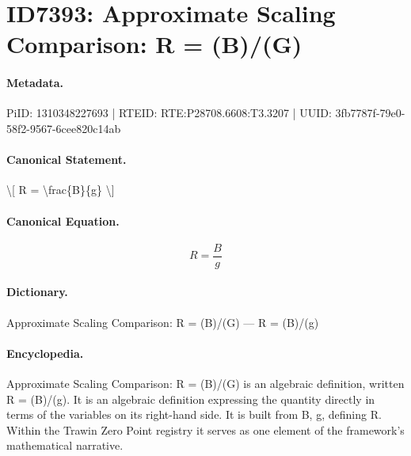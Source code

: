 \section*{ID7393: Approximate Scaling Comparison: R = (B)/(G)}
\paragraph{Metadata.}
PiID: 1310348227693 | RTEID: RTE:P28708.6608:T3.3207 | UUID: 3fb7787f-79e0-58f2-9567-6cee820c14ab

\paragraph{Canonical Statement.}
\textbackslash{}[ R = \textbackslash{}frac\{B\}\{g\} \textbackslash{}]

\paragraph{Canonical Equation.}
\[
R = \frac{B}{g}
\]

\paragraph{Dictionary.}
Approximate Scaling Comparison: R = (B)/(G) — R = (B)/(g)

\paragraph{Encyclopedia.}
Approximate Scaling Comparison: R = (B)/(G) is an algebraic definition, written R = (B)/(g). It is an algebraic definition expressing the quantity directly in terms of the variables on its right-hand side. It is built from B, g, defining R. Within the Trawin Zero Point registry it serves as one element of the framework's mathematical narrative.
